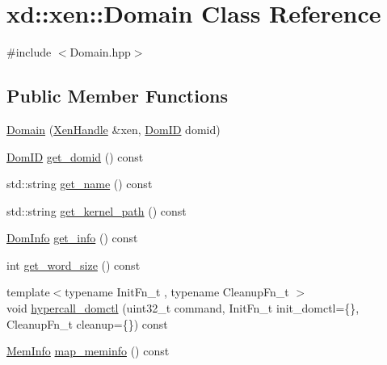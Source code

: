 \hypertarget{classxd_1_1xen_1_1_domain}{}\section{xd\+:\+:xen\+:\+:Domain Class Reference}
\label{classxd_1_1xen_1_1_domain}


{\ttfamily \#include $<$Domain.\+hpp$>$}

\subsection*{Public Member Functions}
\begin{DoxyCompactItemize}
\item 
\mbox{\hyperlink{classxd_1_1xen_1_1_domain_a2ffecc895bc5a1b50794a137607e2990}{Domain}} (\mbox{\hyperlink{classxd_1_1xen_1_1_xen_handle}{Xen\+Handle}} \&xen, \mbox{\hyperlink{namespacexd_1_1xen_aaad6b5eb6f7e5ba76a4e4ca166ac8a08}{Dom\+ID}} domid)
\item 
\mbox{\hyperlink{namespacexd_1_1xen_aaad6b5eb6f7e5ba76a4e4ca166ac8a08}{Dom\+ID}} \mbox{\hyperlink{classxd_1_1xen_1_1_domain_a1b886ef2f2fc5a63ff1ef0d00c97b931}{get\+\_\+domid}} () const
\item 
std\+::string \mbox{\hyperlink{classxd_1_1xen_1_1_domain_a6de301f12604ea3f94c46fdd1b0b65c7}{get\+\_\+name}} () const
\item 
std\+::string \mbox{\hyperlink{classxd_1_1xen_1_1_domain_a2c7d3d134c73442e53fa7562c392ede6}{get\+\_\+kernel\+\_\+path}} () const
\item 
\mbox{\hyperlink{namespacexd_1_1xen_a60588fc8910b3e8b14ac3d51e5de41ba}{Dom\+Info}} \mbox{\hyperlink{classxd_1_1xen_1_1_domain_a11332783d144604c878c8be8f76b9079}{get\+\_\+info}} () const
\item 
int \mbox{\hyperlink{classxd_1_1xen_1_1_domain_aaab1998303488e331a95d5e0bca9b4f3}{get\+\_\+word\+\_\+size}} () const
\item 
{\footnotesize template$<$typename Init\+Fn\+\_\+t , typename Cleanup\+Fn\+\_\+t $>$ }\\void \mbox{\hyperlink{classxd_1_1xen_1_1_domain_a05a0c4b4fbf0bf5f175e1fc4d32a544e}{hypercall\+\_\+domctl}} (uint32\+\_\+t command, Init\+Fn\+\_\+t init\+\_\+domctl=\{\}, Cleanup\+Fn\+\_\+t cleanup=\{\}) const
\item 
\mbox{\hyperlink{namespacexd_1_1xen_a34ff770013f1c25915f83aac337f2334}{Mem\+Info}} \mbox{\hyperlink{classxd_1_1xen_1_1_domain_ac0c491ad709b5145c1fc01e768eedba0}{map\+\_\+meminfo}} () const

\end{DoxyCompactItemize}
